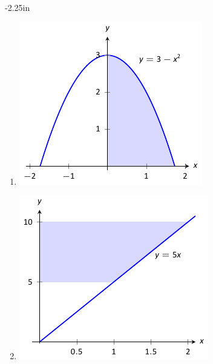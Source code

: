 \begin{adjustwidth*}{}{-2.25in}
\begin{multicols*}{2}
\begin{enumerate}[1),resume]
\item \begin{minipage}{\linewidth}\centering\includegraphics{figures/fig07_02_ex_09}\end{minipage}

\item \begin{minipage}{\linewidth}\centering\includegraphics{figures/fig07_02_ex_10}\end{minipage}
\end{enumerate}

\end{multicols*}
\end{adjustwidth*}

\clearpage

